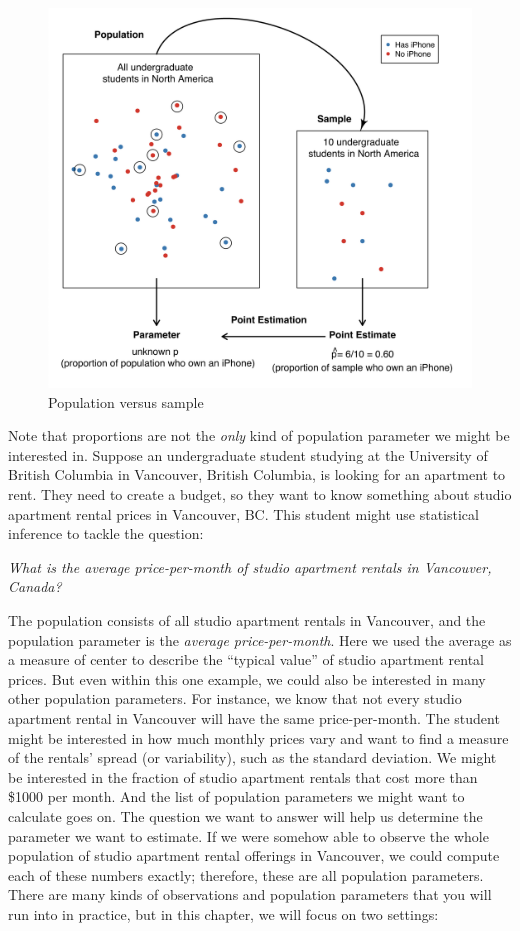 \documentclass[
]{krantz}
\begin{document}
\begin{figure}
\includegraphics[width=1\linewidth]{img/population_vs_sample} \caption{Population versus sample}\label{fig:11-population-vs-sample}
\end{figure}

Note that proportions are not the \emph{only} kind of population parameter we might be interested in. Suppose an undergraduate student studying at the University of British Columbia in Vancouver, British Columbia, is looking for an apartment to rent. They need to create a budget, so they want to know something about studio apartment rental prices in Vancouver, BC. This student might use statistical inference to tackle the question:

\emph{What is the average price-per-month of studio apartment rentals in Vancouver, Canada?}

The population consists of all studio apartment rentals in Vancouver, and the population parameter is the \emph{average price-per-month}. Here we used the average as a measure of center to describe the ``typical value'' of studio apartment rental prices. But even within this one example, we could also be interested in many other population parameters. For instance, we know that not every studio apartment rental in Vancouver will have the same price-per-month. The student might be interested in how much monthly prices vary and want to find a measure of the rentals' spread (or variability), such as the standard deviation. We might be interested in the fraction of studio apartment rentals that cost more than \$1000 per month. And the list of population parameters we might want to calculate goes on. The question we want to answer will help us determine the parameter we want to estimate. If we were somehow able to observe the whole population of studio apartment rental offerings in Vancouver, we could compute each of these numbers exactly; therefore, these are all population parameters. There are many kinds of observations and population parameters that you will run into in practice, but in this chapter, we will focus on two settings:
\end{document}
